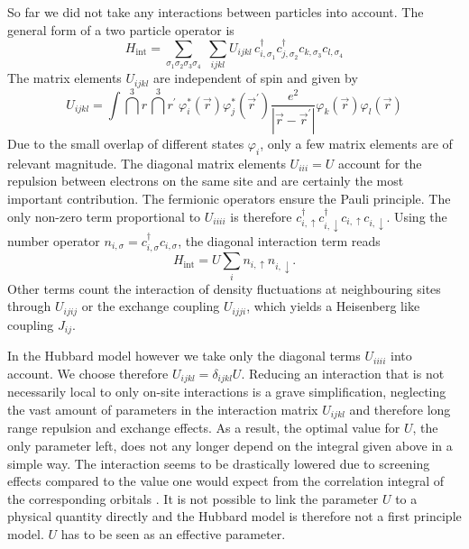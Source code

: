 So far we did not take any interactions between particles into account.
The general form of a two particle operator is
\begin{equation}
 H_{\text{int}} = \sum_{\sigma_1 \sigma_2 \sigma_3 \sigma_4} \; \sum_{ijkl} U_{ijkl} \, c^{\dagger}_{i,\sigma_1} c^{\dagger}_{j,\sigma_2} c_{k,\sigma_3} c_{l,\sigma_4}
\end{equation}
%
The matrix elements $U_{ijkl}$ are independent of spin and given by
\begin{equation}
 U_{ijkl} = \int \!  \dint^3 r  \, \dint^3 r^{\prime} \,  \varphi_i^*(\vec{r}) \varphi_j^*(\vec{r}^{\prime}) \frac{e^2}{|\vec{r}-\vec{r}^{\prime} |} \varphi_k(\vec{r}) \varphi_l(\vec{r}) 
\end{equation}
Due to the small overlap of different states $\varphi_i$, only a few matrix elements are of relevant magnitude.
The diagonal matrix elements $U_{iii} = U$ account for the repulsion between electrons on the same site and are certainly the most important contribution.
The fermionic operators ensure the Pauli principle. 
The only non-zero term proportional to $U_{iiii}$ is therefore $c^{\dagger}_{i,\uparrow} c^{\dagger}_{i,\downarrow} c_{i,\uparrow} c_{i,\downarrow}$. 
Using the number operator $n_{i,\sigma} = c^{\dagger}_{i,\sigma} c_{i,\sigma}$, the diagonal interaction term reads
\begin{equation}
 H_{\text{int}} = U \sum_i n_{i,\uparrow} n_{i,\downarrow}.
\end{equation}
Other terms count the interaction of density fluctuations at neighbouring sites through $U_{ijij}$ 
or
the exchange coupling $U_{ijji}$, which yields a Heisenberg like coupling $J_{ij}$.

In the Hubbard model however we take only the diagonal terms $U_{iiii}$ into account.
We choose therefore $U_{ijkl} = \delta_{ijkl} U$. 
Reducing an interaction that is not necessarily local to only on-site interactions is a grave simplification, 
neglecting the vast amount of parameters in the interaction matrix $U_{ijkl}$ and therefore long range repulsion and exchange effects.
As a result, the optimal value for $U$, the only parameter left, does not any longer depend on the integral given above in a simple way.
The interaction seems to be drastically lowered due to screening effects compared to the value one would expect from the correlation integral of the corresponding orbitals
\cite{J.Phys.Cond.Matter.Vol21.34}.
It is not possible to link the parameter $U$ to a physical quantity directly
and the Hubbard model is therefore not a first principle model. 
$U$ has to be seen as an effective parameter.



